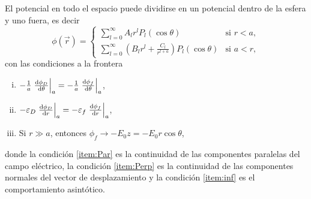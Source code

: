 \documentclass[letterpaper, 12pt] {article}
\begin{document}
El potencial en todo el espacio puede dividirse en un potencial dentro de la esfera y uno fuera, es decir
\begin{equation}
\phi (\vec{r}) = \left\{ 
	\begin{array}{ll}
	\sum\limits_{l=0}^\infty A_l r^l P_l(\cos\theta)& \mbox{si } r<a,\\
	\sum\limits_{l=0}^\infty  \left( B_l r^l + \frac{C_l}{r^{l+a}}\right)P_l(\cos\theta) &\mbox{si }  a<r,
	\end{array} \right.\label{eq:phi}
\end{equation}
con las condiciones a la frontera

{\centering
\begin{enumerate}[(i)]
\item $-\frac{1}{a}\eval{\dv{ \phi_D}{\theta}}_a = -\frac{1}{a}\eval{\dv{ \phi_f}{\theta} }_a$,\label{item:Par}
\item $-\varepsilon_D \eval{\dv{ \phi_D}{r}}_a =-\varepsilon_f \eval{\dv{ \phi_f}{r}}_a$, \label{item:Perp}
\item Si $r\gg a$, entonces $\phi_f \to - E_0 z = - E_0 r\cos\theta$, \label{item:inf}
\end{enumerate}
}
donde la condición \ref{item:Par} es la continuidad de las componentes paralelas del campo eléctrico, la condición \ref{item:Perp} es la continuidad de las componentes normales del vector de desplazamiento y la condición \ref{item:inf} es el comportamiento asintótico.
 
\end{document}
